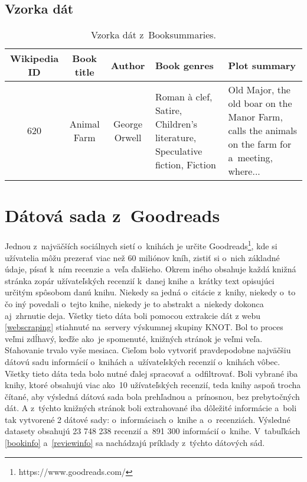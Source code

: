 \subsection*{Vzorka dát}

\begin{table}[hbt]
\centering
\caption{Vzorka dát z~Booksummaries.}
\label{booksummaries}
\begin{tabular}{|c|c|c|
>{\centering\arraybackslash}m{7em}|
>{\centering\arraybackslash}m{7em}|}
\hline
Wikipedia ID & Book title & Author & Book genres & Plot summary \\
\hline
620 & Animal Farm & George Orwell & Roman à clef, Satire, Children's literature, Speculative fiction, Fiction &  Old Major, the old boar on the Manor Farm, calls the animals on the farm for a~meeting, where...\\ 
\hline

\end{tabular}
\end{table}

\section{Dátová sada z~Goodreads} \label{goodreadsdata}

Jednou z~najväčších sociálnych sietí o~knihách je určite Goodreads\footnote{https://www.goodreads.com/}, kde si užívatelia môžu prezerať viac než 60 miliónov kníh, zistiť si o~nich základné údaje, písať k~ním recenzie a~veľa ďalšieho. Okrem iného obsahuje každá knižná stránka zopár užívateľských recenzií k~danej knihe a~krátky text opisujúci určitým spôsobom danú knihu. Niekedy sa jedná o~citácie z~knihy, niekedy o~to čo iný povedali o~tejto knihe, niekedy je to abstrakt a~niekedy dokonca aj~zhrnutie deja. Všetky tieto dáta boli pomocou extrakcie dát z webu \ref{webscraping} stiahnuté na~servery výskumnej skupiny KNOT. Bol to proces veľmi zdĺhavý, keďže ako~je spomenuté, knižných stránok je veľmi veľa. Sťahovanie trvalo vyše mesiaca. Cieľom bolo vytvoriť pravdepodobne najväčšiu dátovú sadu informácií o~knihách a~užívateľských recenzií o~knihách vôbec. Všetky tieto dáta teda bolo nutné ďalej spracovať a~odfiltrovať. Boli vybrané iba knihy, ktoré obsahujú viac ako~10 užívateľských recenzií, teda knihy aspoň trocha čítané, aby výsledná dátová sada bola prehľadnou a~prínosnou, bez prebytočných dát. A z~týchto knižných stránok boli extrahované iba dôležité informácie a~boli tak vytvorené 2 dátové sady: o~informáciach o~knihe a~o~recenziách. Výsledné datasety obsahujú 23 748 238 recenzií a~891 300 informácií o~knihe. V~tabuľkách 
\ref{bookinfo} a~\ref{reviewinfo} sa nachádzajú príklady z~týchto dátových sád.

